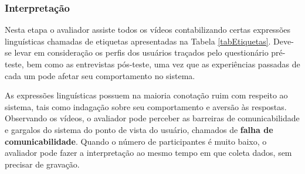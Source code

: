 \subsubsection{Interpretação}

\indent Nesta etapa o avaliador assiste todos os vídeos contabilizando certas expressões linguísticas chamadas de etiquetas apresentadas na Tabela \ref{tabEtiquetas}. Deve-se levar em consideração os perfis dos usuários traçados pelo questionário pré-teste, bem como as entrevistas pós-teste, uma vez que as experiências passadas de cada um pode afetar seu comportamento no sistema. 

\indent As expressões linguísticas possuem na maioria conotação ruim com respeito ao sistema, tais como indagação sobre seu comportamento e aversão às respostas. Observando os vídeos, o avaliador pode perceber as barreiras de comunicabilidade e gargalos do sistema do ponto de vista do usuário, chamados de \textbf{falha de comunicabilidade}. Quando o número de participantes é muito baixo, o avaliador pode fazer a interpretação ao mesmo tempo em que coleta dados, sem precisar de gravação.

